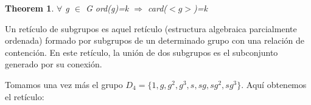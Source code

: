 \documentclass[a4paper,10pt]{apuntes}
\newtheorem{theorem}{Theorem}[section]
\newenvironment{definition}[1][Definition]{\begin{trivlist}
\item[\hskip \labelsep {\bfseries #1}]}{\end{trivlist}}
\newenvironment{example}[1][Example]{\begin{trivlist}
\item[\hskip \labelsep {\bfseries #1}]}{\end{trivlist}}
\begin{document}
  \begin{theorem}
   $\forall$  g $\in$ G ord(g)=k $\Rightarrow$  card($<g>$)=k
  \end{theorem}

  \begin{definition}
   Un retículo de subgrupos es aquel retículo (estructura algebraica parcialmente ordenada) formado por subgrupos de un determinado grupo
   con una relación de contención. En este retículo, la unión de dos subgrupos es el subconjunto generado por su conexión.
  \end{definition}

  \begin{example}
   Tomamos una vez más el grupo $D_{4}=\{1,g,g^{2}, g^{3}, s, sg, sg^{2}, sg^{3}\}$. Aquí obtenemos el retículo:
   
  \end{example}
\end{document}
